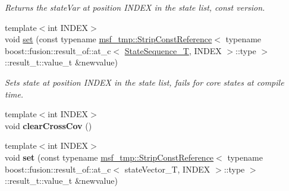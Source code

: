 \begin{DoxyCompactItemize}
\begin{DoxyCompactList}\small\item\em Returns the state\-Var at position I\-N\-D\-E\-X in the state list, const version. \end{DoxyCompactList}\item 
\hypertarget{structmsf__core_1_1GenericState__T_ac5dc9e9190db9f0faf77e6bc373484ff}{{\footnotesize template$<$int I\-N\-D\-E\-X$>$ }\\void \hyperlink{structmsf__core_1_1GenericState__T_ac5dc9e9190db9f0faf77e6bc373484ff}{set} (const typename \hyperlink{structmsf__tmp_1_1StripConstReference}{msf\-\_\-tmp\-::\-Strip\-Const\-Reference}$<$ typename boost\-::fusion\-::result\-\_\-of\-::at\-\_\-c$<$ \hyperlink{structmsf__core_1_1GenericState__T_a75fe70f7c7517dbf7d4c91b75b08a1dd}{State\-Sequence\-\_\-\-T}, I\-N\-D\-E\-X $>$\-::type $>$\-::result\-\_\-t\-::value\-\_\-t \&newvalue)}\label{structmsf__core_1_1GenericState__T_ac5dc9e9190db9f0faf77e6bc373484ff}

\begin{DoxyCompactList}\small\item\em Sets state at position I\-N\-D\-E\-X in the state list, fails for core states at compile time. \end{DoxyCompactList}\item 
\hypertarget{structmsf__core_1_1GenericState__T_af549612e16331a261cec92ac5661a092}{{\footnotesize template$<$int I\-N\-D\-E\-X$>$ }\\void {\bfseries clear\-Cross\-Cov} ()}\label{structmsf__core_1_1GenericState__T_af549612e16331a261cec92ac5661a092}

\item 
\hypertarget{structmsf__core_1_1GenericState__T_a4d1ee0b277d6ef5c297b412d98f03efc}{{\footnotesize template$<$int I\-N\-D\-E\-X$>$ }\\void {\bfseries set} (const typename \hyperlink{structmsf__tmp_1_1StripConstReference}{msf\-\_\-tmp\-::\-Strip\-Const\-Reference}$<$ typename boost\-::fusion\-::result\-\_\-of\-::at\-\_\-c$<$ state\-Vector\-\_\-\-T, I\-N\-D\-E\-X $>$\-::type $>$\-::result\-\_\-t\-::value\-\_\-t \&newvalue)}\label{structmsf__core_1_1GenericState__T_a4d1ee0b277d6ef5c297b412d98f03efc}

\end{DoxyCompactItemize}
